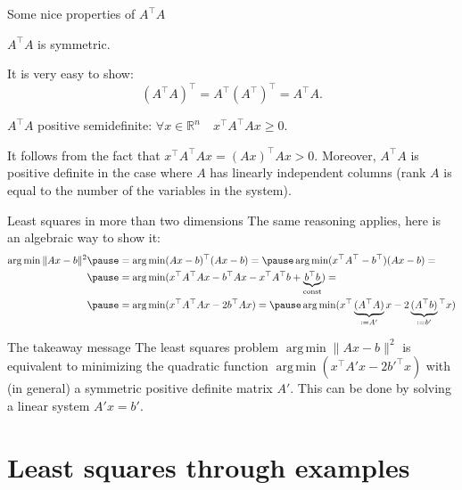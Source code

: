 \documentclass[UKenglish,aspectratio=169]{beamer}
\DeclareMathOperator*{\argmin}{arg\,min}
\begin{document}
\begin{frame}{Some nice properties of $A^\top A$}
\begin{theorem}
$A^\top A$ is symmetric.
\end{theorem}
\pause
It is very easy to show:
$$
(A^\top A)^\top = A^\top (A^\top)^\top = A^\top A.
$$

\pause
\begin{theorem}
$A^\top A$ positive semidefinite: $\forall x\in \mathbb R^n\quad x^\top A^\top A x \geq 0.$
\end{theorem}
\pause
It follows from the fact that $x^\top A^\top A x = (A x)^\top A x > 0$.
Moreover, $A^\top A$ is positive definite in the case where $A$ has linearly independent columns (rank $A$ is equal to the number of the variables in the system).
\end{frame}

\begin{frame}{Least squares in more than two dimensions}
The same reasoning applies, here is an algebraic way to show it:
$$
\begin{aligned}
\argmin \| Ax - b \|^2 \pause &= \argmin (Ax-b)^\top (Ax-b) = \pause
 \argmin(x^\top A^\top - b^\top)(Ax-b) = \\ \pause
& = \argmin(x^\top A^\top A x - b^\top Ax - x^\top A^\top b + \underbrace{b^\top b}_{\rm const})=\\ \pause
& = \argmin(x^\top A^\top A x - 2b^\top Ax) = \pause
 \argmin(x^\top \underbrace{(A^\top A)}_{:=A'} x - 2\underbrace{(A^\top b)}_{:=b'}\phantom{}^\top x)
\end{aligned}
$$
\pause
\begin{block}{The takeaway message}
The least squares problem $\argmin \| Ax - b \|^2$  is equivalent to minimizing the quadratic function $\argmin \left(x^\top A' x - 2b'^\top x\right)$
with (in general) a symmetric positive definite matrix $A'$. This can be done by solving a linear system $A'x = b'$.
\end{block}
\end{frame}





\section{Least squares through examples}
\end{document}
